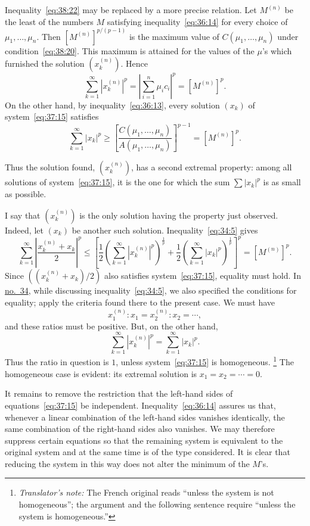 \documentclass[
  paper=b5,
  fontsize=13pt,
  twoside=true,
  open=any,
  bookmarkpackage=false,
  chapterprefix=true,
  headings=normal
]{scrbook}
\theoremstyle{definition}
\newcounter{translatornote}
\newcommand{\translatornotelabel}{T\arabic{translatornote}}
\newcommand{\translatornote}[1]{%
  \stepcounter{translatornote}%
  \begingroup
    \edef\savedfootnotenumber{\number\value{footnote}}%
    \renewcommand{\thefootnote}{\translatornotelabel}%
    \footnote{\emph{Translator's note:} #1}%
    \setcounter{footnote}{\savedfootnotenumber}%
  \endgroup
}
\begin{document}
Inequality~\eqref{eq:38:22} may be replaced by a more precise relation. Let $M^{(n)}$ be the least of the numbers $M$ satisfying inequality~\eqref{eq:36:14} for every choice of $\mu_1,\ldots,\mu_n$. Then $[M^{(n)}]^{p/(p-1)}$ is the maximum value of $C(\mu_1,\ldots,\mu_n)$ under condition~\eqref{eq:38:20}. This maximum is attained for the values of the $\mu$'s which furnished the solution $(x_k^{(n)})$. Hence
\begin{equation}
 \sum_{k=1}^{\infty}|x_k^{(n)}|^p
 =\left|\sum_{i=1}^{n}\mu_i c_i\right|^p
 =[M^{(n)}]^p.
 \tag{23}\label{eq:38:23}
\end{equation}
On the other hand, by inequality~\eqref{eq:36:13}, every solution $(x_k)$ of system~\eqref{eq:37:15} satisfies
\[
 \sum_{k=1}^{\infty}|x_k|^p
 \geq\left[\frac{C(\mu_1,\ldots,\mu_n)}{A(\mu_1,\ldots,\mu_n)}\right]^{p-1}
 =[M^{(n)}]^p.
\]

Thus the solution found, $(x_k^{(n)})$, has a second extremal property: among all solutions of system~\eqref{eq:37:15}, it is the one for which the sum $\sum|x_k|^p$ is as small as possible.

I say that $(x_k^{(n)})$ is the only solution having the property just observed. Indeed, let $(x_k)$ be another such solution. Inequality~\eqref{eq:34:5} gives
\[
 \sum_{k=1}^{\infty}\left|\frac{x_k^{(n)}+x_k}{2}\right|^p
 \leq
 \left[
  \frac12\left(\sum_{k=1}^{\infty}|x_k^{(n)}|^p\right)^{\frac1p}
 +\frac12\left(\sum_{k=1}^{\infty}|x_k|^p\right)^{\frac1p}
 \right]^p
 =[M^{(n)}]^p.
\]
Since $((x_k^{(n)}+x_k)/2)$ also satisfies system~\eqref{eq:37:15}, equality must hold. In \hyperref[sec:34]{no.~34}, while discussing inequality~\eqref{eq:34:5}, we also specified the conditions for equality; apply the criteria found there to the present case. We must have
\[
 x_1^{(n)}:x_1=x_2^{(n)}:x_2=\cdots,
\]
and these ratios must be positive. But, on the other hand,
\[
 \sum_{k=1}^{\infty}|x_k^{(n)}|^p
 =\sum_{k=1}^{\infty}|x_k|^p.
\]
Thus the ratio in question is $1$, unless system~\eqref{eq:37:15} is homogeneous.\translatornote{The French original reads ``unless the system is not homogeneous''; the argument and the following sentence require ``unless the system is homogeneous.''} The homogeneous case is evident: its extremal solution is $x_1=x_2=\cdots=0$.

It remains to remove the restriction that the left-hand sides of equations~\eqref{eq:37:15} be independent. Inequality~\eqref{eq:36:14} assures us that, whenever a linear combination of the left-hand sides vanishes identically, the same combination of the right-hand sides also vanishes. We may therefore suppress certain equations so that the remaining system is equivalent to the original system and at the same time is of the type considered. It is clear that reducing the system in this way does not alter the minimum of the $M$'s.
\end{document}
